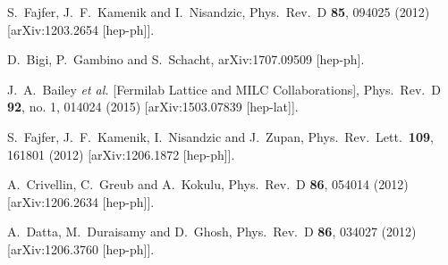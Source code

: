 \documentclass[prd,preprint,superscriptaddress,amsmath,amssymb]{revtex4}
\begin{document}
\begin{thebibliography}{100}
  S.~Fajfer, J.~F.~Kamenik and I.~Nisandzic,
  Phys.\ Rev.\ D {\bf 85}, 094025 (2012)
  [arXiv:1203.2654 [hep-ph]].


  D.~Bigi, P.~Gambino and S.~Schacht,
  arXiv:1707.09509 [hep-ph].
  
   
  
  
  J.~A.~Bailey {\it et al.} [Fermilab Lattice and MILC Collaborations],
  Phys.\ Rev.\ D {\bf 92}, no. 1, 014024 (2015)
  [arXiv:1503.07839 [hep-lat]].
  
 
  
   
  
  S.~Fajfer, J.~F.~Kamenik, I.~Nisandzic and J.~Zupan,
  Phys.\ Rev.\ Lett.\  {\bf 109}, 161801 (2012)
  [arXiv:1206.1872 [hep-ph]].

  A.~Crivellin, C.~Greub and A.~Kokulu,
  Phys.\ Rev.\ D {\bf 86}, 054014 (2012)
  [arXiv:1206.2634 [hep-ph]].

  A.~Datta, M.~Duraisamy and D.~Ghosh,
  Phys.\ Rev.\ D {\bf 86}, 034027 (2012)
  [arXiv:1206.3760 [hep-ph]].


\end{thebibliography}
\end{document}
